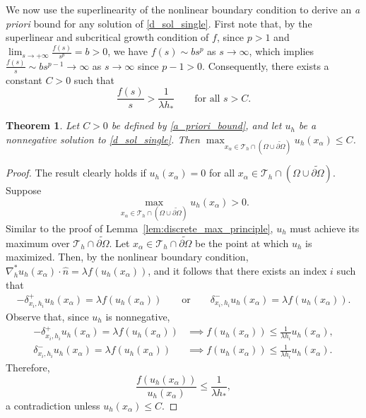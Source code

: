 \documentclass[12pt, reqno]{amsart}
\numberwithin{equation}{section}
\newtheorem{thm}{Theorem}[section]
\begin{document}
We now use the superlinearity of the nonlinear boundary condition to 
derive an {\it a priori} bound for any solution of \eqref{d_sol_single}.  
First note that, by the superlinear and subcritical growth condition of $f$, since $p > 1$ and $\lim_{s \to +\infty} \frac{f(s)}{s^p} = b > 0$, we have $f(s) \sim bs^p$ as $s \to \infty$, which implies $\frac{f(s)}{s} \sim bs^{p-1} \to \infty$ as $s \to \infty$ since $p-1 > 0$.
Consequently, there exists a constant $C>0$ such that 
\begin{equation}\label{a_priori_bound}
    \frac{f(s)}{s} > \frac{1}{\lambda h_*} \qquad \text{for all } s > C . 
\end{equation}

\begin{thm}\label{thm:stability}
Let $C > 0$ be defined by \eqref{a_priori_bound}, and let $u_h$ be a nonnegative solution to \eqref{d_sol_single}.  
Then $\max_{x_\alpha \in \mathcal{T}_h \cap (\Omega \cup \widetilde{\partial \Omega})} u_h (x_\alpha) \leq C$.  
\end{thm}

\begin{proof}
The result clearly holds if $u_h(x_\alpha) = 0$ for all $x_\alpha \in \mathcal{T}_h \cap (\Omega \cup \widetilde{\partial \Omega})$.  Suppose 
\[
\max_{x_\alpha \in \mathcal{T}_h \cap (\Omega \cup \widetilde{\partial \Omega})} u_h (x_\alpha) > 0.
\]
Similar to the proof of Lemma~\ref{lem:discrete_max_principle}, $u_h$ must achieve its maximum over $\mathcal{T}_h \cap \widetilde{\partial \Omega}$.  Let $x_\alpha \in \mathcal{T}_h \cap \widetilde{\partial \Omega}$ be the point at which $u_h$ is maximized.  
Then, by the nonlinear boundary condition, 
$\nabla_h^* u_h(x_\alpha) \cdot \widehat{n} = \lambda f( u_h(x_\alpha))$, 
and it follows that there exists an index $i$ such that 
\begin{align*}
- \delta_{x_i, h_i}^+ u_h(x_\alpha) = \lambda  f( u_h(x_\alpha)) \qquad \text{or} \qquad 
\delta_{x_i, h_i}^- u_h(x_\alpha) = \lambda  f( u_h(x_\alpha)) . 
\end{align*}
Observe that, since $u_h$ is nonnegative, 
\begin{align*}
- \delta_{x_i, h_i}^+ u_h(x_\alpha) = \lambda  f( u_h(x_\alpha)) 
& \implies 
f( u_h(x_\alpha)) \leq \frac{1}{\lambda h_i} u_h(x_\alpha) , \\ 
\delta_{x_i, h_i}^- u_h(x_\alpha) = \lambda  f( u_h(x_\alpha)) 
& \implies 
f( u_h(x_\alpha)) \leq \frac{1}{\lambda h_i} u_h(x_\alpha) . 
\end{align*}
Therefore, 
\[
\frac{f( u_h(x_\alpha))}{u_h(x_\alpha)} \leq \frac{1}{\lambda h_*} , 
\]
a contradiction unless $u_h(x_\alpha) \leq C$.  
\end{proof}
\end{document}
